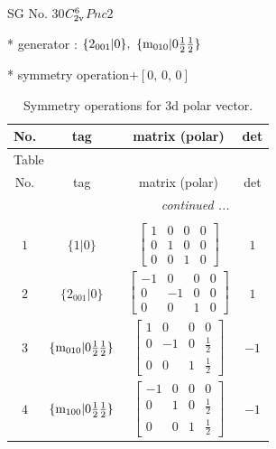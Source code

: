 \documentclass[fleqn,8pt]{jsarticle}
\begin{document}
\setcounter{MaxMatrixCols}{32}

\renewcommand{\tablename}{Table~}
\renewcommand{\figurename}{Figure~}
\begin{center}
\LARGE
SG No. 30\quad$C_{\rm 2v}^{6}$\quad$Pnc2$\quad[ orthorhombic ]
\end{center}

* generator : $\{2{}_{001}|0\},\,\,\{{\rm m}_{010}|0 \frac{1}{2} \frac{1}{2}\}$

* symmetry operation\quad$+\left[ 0,\, 0,\, 0 \right]$
\renewcommand{\arraystretch}{1.3}
\begin{longtable}{cccc}
\caption{Symmetry operations for 3d polar vector.}
 \\
 \hline \hline
No. & tag & matrix (polar) & det \\ \hline \endfirsthead

\multicolumn{3}{l}{\tablename\ \thetable{}} \\
 \hline \hline
No. & tag & matrix (polar) & det \\ \hline \endhead

 \hline \hline
\multicolumn{3}{r}{\footnotesize\it continued ...} \\ \endfoot

 \hline \hline
\multicolumn{3}{r}{} \\ \endlastfoot

$ 1 $ & $ \{1|0\} $ & $ \begin{bmatrix} 1 & 0 & 0 & 0 \\ 0 & 1 & 0 & 0 \\ 0 & 0 & 1 & 0 \end{bmatrix} $ & $ 1 $ \\ \hline
$ 2 $ & $ \{2{}_{001}|0\} $ & $ \begin{bmatrix} -1 & 0 & 0 & 0 \\ 0 & -1 & 0 & 0 \\ 0 & 0 & 1 & 0 \end{bmatrix} $ & $ 1 $ \\ \hline
$ 3 $ & $ \{{\rm m}_{010}|0 \frac{1}{2} \frac{1}{2}\} $ & $ \begin{bmatrix} 1 & 0 & 0 & 0 \\ 0 & -1 & 0 & \frac{1}{2} \\ 0 & 0 & 1 & \frac{1}{2} \end{bmatrix} $ & $ -1 $ \\ \hline
$ 4 $ & $ \{{\rm m}_{100}|0 \frac{1}{2} \frac{1}{2}\} $ & $ \begin{bmatrix} -1 & 0 & 0 & 0 \\ 0 & 1 & 0 & \frac{1}{2} \\ 0 & 0 & 1 & \frac{1}{2} \end{bmatrix} $ & $ -1 $ \\
\end{longtable}
\end{document}
